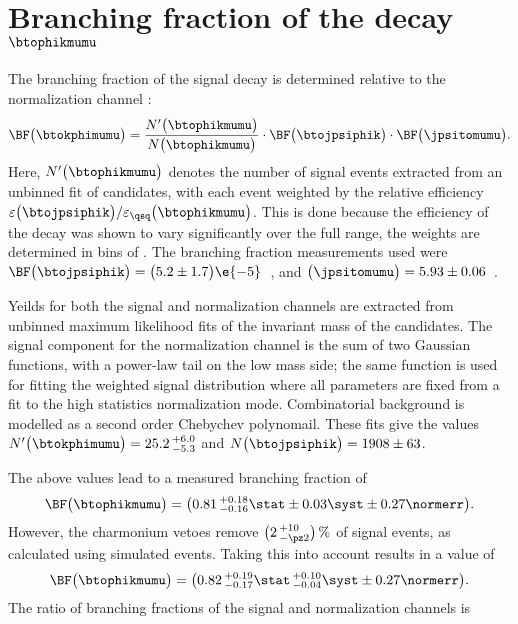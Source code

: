 \section[Branching fraction of the decay \btophikmumu]{Branching fraction of the decay
  $\boldsymbol{\btophikmumu}$}

The branching fraction of the signal decay \btophikmumu is determined relative to the normalization
channel \btojpsiphik:
\begin{equation}
  \BF\big(\btokphimumu\big)=
  \frac{ N^\prime\big(\btophikmumu\big) }{ N\big(\btophikmumu\big) }
  \cdot\BF\big(\btojpsiphik\big)
  \cdot\BF\big(\jpsitomumu\big).
\end{equation}
Here, $N^\prime\big(\btophikmumu\big)$ denotes the number of signal events extracted from an
unbinned fit of \btophikmumu candidates, with each event weighted by the relative efficiency
$\varepsilon\big(\btojpsiphik\big) / \varepsilon_\qsq\big(\btophikmumu\big)$.
This is done because the efficiency of the decay \btophikmumu was shown to vary significantly over
the full \qsq range, the weights are determined in bins of \qsq.
The branching fraction measurements used were
$\BF\big(\btojpsiphik\big)=\big(5.2\pm1.7\big)\e{-5}$~\cite{PDG2012},
and $\big(\jpsitomumu\big)=5.93\pm0.06$~\cite{PDG2012}.

Yeilds for both the signal and normalization channels are extracted from unbinned maximum
likelihood fits of the invariant mass of the \Bp candidates.
The signal component for the normalization channel is the sum of two Gaussian functions, with a
power-law tail on the low mass side; the same function is used for fitting the weighted signal
distribution where all parameters are fixed from a fit to the high statistics normalization mode.
Combinatorial background is modelled as a second order Chebychev polynomail.
These fits give the values
$N^\prime\big(\btokphimumu\big)=25.2\,^{+6.0}_{-5.3}$ and
$N\big(\btojpsiphik\big)=1908\pm63$.

The above values lead to a measured branching fraction of
\begin{equation}
  \BF\big(\btophikmumu\big)=
  \big(0.81\,^{+0.18}_{-0.16}\stat\pm0.03\syst\pm0.27\normerr\big).
\end{equation}
However, the charmonium vetoes remove $\big(2\,^{+10}_{-\pz2}\big)\,\%$ of signal events, as
calculated using simulated events.
Taking this into account results in a value of
\begin{equation}
  \BF\big(\btophikmumu\big)=
  \big(0.82\,^{+0.19}_{-0.17}\stat\,^{+0.10}_{-0.04}\syst\pm0.27\normerr\big).
\end{equation}
The ratio of branching fractions of the signal and normalization channels is

